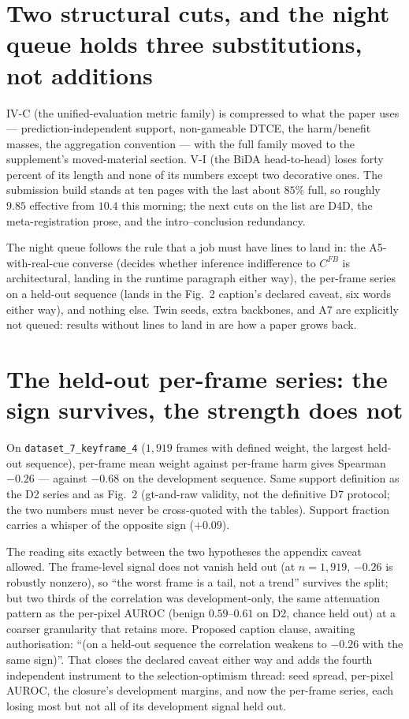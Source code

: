 \documentclass[11pt,a4paper]{article}
\begin{document}
\section*{Two structural cuts, and the night queue holds three substitutions, not additions}

IV-C (the unified-evaluation metric family) is compressed to what the paper
uses --- prediction-independent support, non-gameable DTCE, the harm/benefit
masses, the aggregation convention --- with the full family moved to the
supplement's moved-material section. V-I (the BiDA head-to-head) loses forty
percent of its length and none of its numbers except two decorative ones. The
submission build stands at ten pages with the last about $85\%$ full, so
roughly $9.85$ effective from $10.4$ this morning; the next cuts on the list
are D4D, the meta-registration prose, and the intro--conclusion redundancy.

The night queue follows the rule that a job must have lines to land in: the
A5-with-real-cue converse (decides whether inference indifference to $C^{FB}$
is architectural, landing in the runtime paragraph either way), the per-frame
series on a held-out sequence (lands in the Fig.~2 caption's declared caveat,
six words either way), and nothing else. Twin seeds, extra backbones, and A7
are explicitly not queued: results without lines to land in are how a paper
grows back.



\section*{The held-out per-frame series: the sign survives, the strength does not}

On \texttt{dataset\_7\_keyframe\_4} ($1{,}919$ frames with defined weight, the
largest held-out sequence), per-frame mean weight against per-frame harm
gives Spearman $-0.26$ --- against $-0.68$ on the development sequence. Same
support definition as the D2 series and as Fig.~2 (gt-and-raw validity, not
the definitive D7 protocol; the two numbers must never be cross-quoted with
the tables). Support fraction carries a whisper of the opposite sign
($+0.09$).

The reading sits exactly between the two hypotheses the appendix caveat
allowed. The frame-level signal does not vanish held out (at $n{=}1{,}919$,
$-0.26$ is robustly nonzero), so ``the worst frame is a tail, not a trend''
survives the split; but two thirds of the correlation was development-only,
the same attenuation pattern as the per-pixel AUROC (benign $0.59$--$0.61$ on
D2, chance held out) at a coarser granularity that retains more. Proposed
caption clause, awaiting authorisation: ``(on a held-out sequence the
correlation weakens to $-0.26$ with the same sign)''. That closes the
declared caveat either way and adds the fourth independent instrument to the
selection-optimism thread: seed spread, per-pixel AUROC, the closure's
development margins, and now the per-frame series, each losing most but not
all of its development signal held out.
\end{document}
